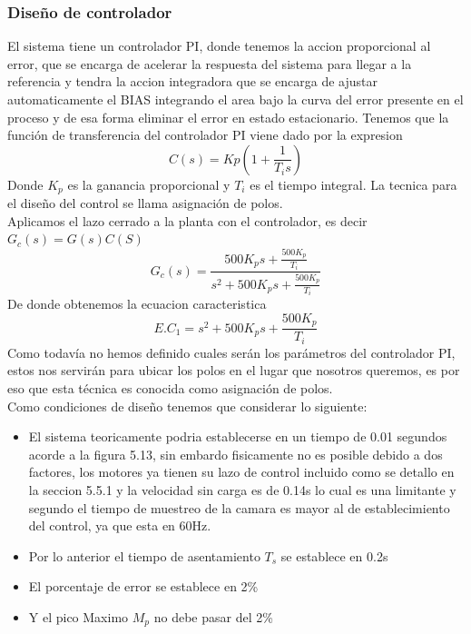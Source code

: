 \subsubsection{Diseño de controlador}
El sistema tiene un controlador PI, donde tenemos la accion proporcional al error, que se encarga de acelerar la respuesta del sistema para llegar a la referencia
y tendra la accion integradora que se encarga de ajustar automaticamente el BIAS integrando el area bajo la curva del error presente en el proceso y de esa forma 
eliminar el error en estado estacionario. Tenemos que la función de transferencia del controlador PI viene dado por la expresion 
\begin{equation}
	C(s) = Kp(1 + \frac{1}{T_is})
\end{equation}
Donde $K_p$ es la ganancia proporcional y $T_i$ es el tiempo integral. La tecnica para el diseño del control se llama asignación de polos.\\
Aplicamos el lazo cerrado a la planta con el controlador, es decir $G_c(s) =  G(s)C(S)$
\begin{equation}
	G_c(s) = \frac{500K_ps + \frac{500K_p}{T_i}}{s^2 + 500K_ps + \frac{500K_p}{T_i}}
\end{equation}
De donde obtenemos la ecuacion caracteristica 
\begin{equation}
	E.C_1 = s^2 + 500K_ps + \frac{500K_p}{T_i}
\end{equation}
Como todavía no hemos definido cuales serán los parámetros del controlador PI, estos nos servirán para ubicar los polos en el lugar que nosotros queremos, es por 
eso que esta técnica es conocida como asignación de polos.\\
Como condiciones de diseño tenemos que considerar lo siguiente:
\begin{itemize}
	\item El sistema teoricamente podria establecerse en un tiempo de 0.01 segundos acorde a la figura 5.13, sin embardo fisicamente no es posible debido a dos 
		  factores, los motores ya tienen su lazo de control incluido como se detallo en la seccion 5.5.1 y la velocidad sin carga es de 0.14s lo cual es una
		  limitante y segundo el tiempo de muestreo de la camara es mayor al de establecimiento del control, ya que esta en 60Hz.
	\item Por lo anterior el tiempo de asentamiento $T_s$ se establece en 0.2s 
	\item El porcentaje de error se establece en 2\%
	\item Y el pico Maximo $M_p$ no debe pasar del 2\%
\end{itemize}
